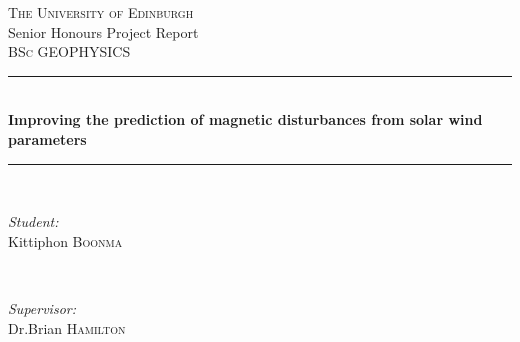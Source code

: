 \documentclass[12pt]{report} %
\begin{document}
\begin{titlepage}

\newcommand{\HRule}{\rule{\linewidth}{0.5mm}} %

\center %
 

\textsc{\LARGE The University of Edinburgh}\\[1.5cm] %
\Large Senior Honours Project Report \\[0.5cm] %
\textsc{\large BSc GEOPHYSICS}\\[0.5cm] %


\HRule \\[0.4cm]
{ \huge \bfseries Improving the prediction of magnetic disturbances from solar wind parameters}\\[0.4cm] %
\HRule \\[1.5cm]
 

\begin{minipage}{0.4\textwidth}
\begin{flushleft} \large
\emph{Student:}\\
Kittiphon \textsc{Boonma} %
\end{flushleft}
\end{minipage}
~
\begin{minipage}{0.4\textwidth}
\begin{flushright} \large
\emph{Supervisor:} \\
Dr.Brian \textsc{Hamilton} %
\end{flushright}
\end{minipage}\\[4cm]



\end{titlepage}
\end{document}
